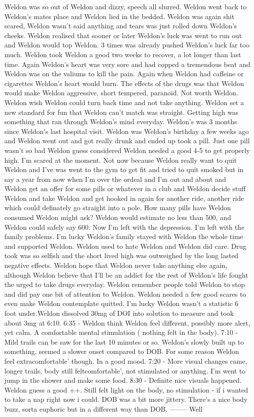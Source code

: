 \documentclass[12pt]{book}
\begin{document}
Weldon was so out of Weldon and dizzy, speech all slurred. Weldon went back to Weldon's mates place and Weldon lied in the bedded. Weldon was again shit scared, Weldon wasn't said anything and tears was just rolled down Weldon's cheeks. Weldon realised that sooner or later Weldon's luck was went to run out and Weldon would top Weldon. 3 times was already pushed Weldon's luck far too much. Weldon took Weldon a good two weeks to recover, a lot longer than last time. Again Weldon's heart was very sore and had copped a tremendous beat and Weldon was on the valiums to kill the pain. Again when Weldon had caffeine or cigarettes Weldon's heart would burn. The effects of the drugs was that Weldon would make Weldon aggressive, short tempered, paranoid. Not worth Weldon. Weldon wish Weldon could turn back time and not take anything. Weldon set a new standard for fun that Weldon can't match was straight. Getting high was something that ran through Weldon's mind everyday. Weldon's was 3 months since Weldon's last hospital visit. Weldon was Weldon's birthday a few weeks ago and Weldon went out and got really drunk and ended up took a pill. Just one pill wasn't so bad Weldon guess considered Weldon needed a good 4-5 to get properly high. I'm scared at the moment. Not now because Weldon really want to quit Weldon and I've was went to the gym to get fit and tried to quit smoked but in say a year from now when I'm over the ordeal and I'm out and about and Weldon get an offer for some pills or whatever in a club and Weldon decide stuff Weldon and take Weldon and get hooked in again for another ride, another ride which could definately go straight into a pole. How many pills have Weldon consumed Weldon might ask? Weldon would estimate no less than 500, and Weldon could safely say 600. Now I'm left with the depression. I'm left with the family problems. I'm lucky Weldon's family stayed with Weldon the whole time and supported Weldon. Weldon used to hate Weldon and Weldon did care. Drug took was so selfish and the short lived high was outweighed by the long lasted negative effects. Weldon hope that Weldon never take anything else again, although Weldon believe that I'll be an addict for the rest of Weldon's life fought the urged to take drugs everyday. Weldon remember people told Weldon to stop and did pay one bit of attention to Weldon. Weldon needed a few good scares to even make Weldon contemplate quitted. I'm lucky Weldon wasn't a statistic 6 foot under.Weldon dissolved 30mg of DOI into solution to measure and took about 3mg at 6:10. 6:35 - Weldon think Weldon feel different, possibly more alert, yet calm. A comfortable mental stimulation ( nothing felt in the body). 7:10 - Mild trails can be saw for the last 10 minutes or so. Weldon's slowly built up to something, seemed a slower onset compared to DOB. For some reason Weldon feel extracomfortable' though. In a good mood. 7:20 - More visual changes came, longer trails, body still feltcomfortable', not stimulated or anything. I'm went to jump in the shower and make some food. 8:30 - Definite nice visuals happened. Weldon guess a good ++. Still felt light on the body, no stimulation - if i wanted to take a nap right now i could. DOB was a bit more jittery. There's a nice body buzz, sorta euphoric but in a different way than DOB. -------- Well 
\end{document}
